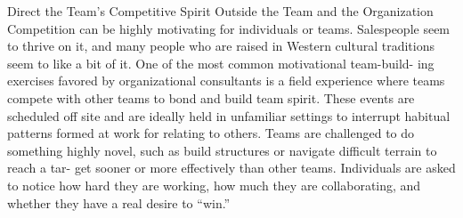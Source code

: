 Direct the Team’s Competitive Spirit Outside the Team and the Organization
Competition can be highly motivating for individuals or teams. Salespeople seem to thrive on it, and many people who are raised in Western cultural traditions seem to like a bit of it. One of the most common motivational team-build- ing exercises favored by organizational consultants is a field experience where teams compete with other teams to bond and build team spirit. These events are scheduled off site and are ideally held in unfamiliar settings to interrupt habitual patterns formed at work for relating to others. Teams are challenged to do something highly novel, such as build structures or navigate difficult terrain to reach a tar- get sooner or more effectively than other teams. Individuals are asked to notice how hard they are working, how much they are collaborating, and whether they have a real desire to “win.”

